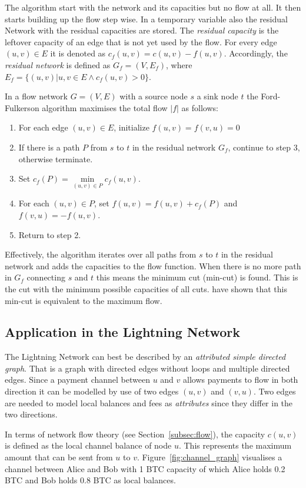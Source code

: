 \documentclass[final]{fhnwreport}       %
\begin{document}
The algorithm start with the network and its capacities but no flow at all. It then starts building up the flow step wise. In a temporary variable also the residual Network with the residual capacities are stored. The \emph{residual capacity} is the leftover capacity of an edge that is not yet used by the flow. For every edge $(u,v) \in E$ it is denoted as $c_f(u,v) = c(u,v)-f(u,v)$. Accordingly, the \emph{residual network} is defined as $G_f = (V, E_f)$, where $E_f=\{(u,v) | u, v \in  E \land c_f(u,v)>0\}$.

In a flow network $G = (V, E)$ with a source node $s$ a sink node $t$ the Ford-Fulkerson algorithm maximises the total flow $|f|$ as follows:

\begin{enumerate}
  \item For each edge $(u,v) \in E$, initialize $f(u, v)=f(v, u) = 0$
  \item If there is a path $P$ from $s$ to $t$ in the residual network $G_f$, continue to step 3, otherwise terminate.
  \item Set $c_f(P) = \min\limits_{(u,v) \in P} c_f(u, v)$.
  \item For each $(u,v) \in P$, set $f(u,v) = f(u, v) + c_f(P)$ and $f(v,u) = -f(u,v)$.
  \item Return to step 2.
\end{enumerate}

Effectively, the algorithm iterates over all paths from $s$ to $t$ in the residual network and adds the capacities to the flow function. When there is no more path in $G_f$ connecting $s$ and $t$ this means the minimum cut (min-cut) is found. This is the cut with the minimum possible capacities of all cuts. \textcite{ford_maximal_1956} have shown that this min-cut is equivalent to the maximum flow. 

\subsection{Application in the Lightning Network}
The Lightning Network can best be described by an \emph{attributed simple directed graph}. That is a graph with directed edges without loops and multiple directed edges. Since a payment channel between $u$ and $v$ allows payments to flow in both direction it can be modelled by use of two edges $(u, v)$ and $(v, u)$. Two edges are needed to model local balances and fees as \emph{attributes} since they differ in the two directions.

In terms of network flow theory (see Section~\ref{subsec:flow}), the capacity $c(u,v)$ is defined as the local channel balance of node $u$. This represents the maximum amount that can be sent from $u$ to $v$. Figure~\ref{fig:channel_graph} visualises a channel between Alice and Bob with 1 BTC capacity of which Alice holds 0.2 BTC and Bob holds 0.8 BTC as local balances. 
\end{document}
